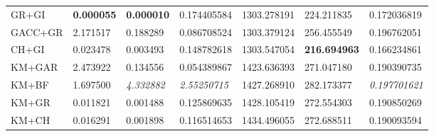\begin{table}[H]
\begin{tabular}{lllllll}
        GR+GI      & \textbf{0.000055}                                                   & \textbf{0.000010}                                                     & 0.174405584                                                                        & 1303.278191          & 224.211835            & 0.172036819                       \\
        GACC+GR    & 2.171517                                                            & 0.188289                                                              & 0.086708524                                                                        & 1303.379124          & 256.455549            & 0.196762051                       \\
        CH+GI      & 0.023478                                                            & 0.003493                                                              & 0.148782618                                                                        & 1303.547054          & \textbf{216.694963}   & 0.166234861                       \\
        KM+GAR     & 2.473922                                                            & 0.134556                                                              & 0.054389867                                                                        & 1423.636393          & 271.047180            & 0.190390735                       \\
        KM+BF      & 1.697500                                                            & \textit{4.332882}                                                     & \textit{2.55250715}                                                                & 1427.268910          & 282.173377            & \textit{0.197701621}              \\
        KM+GR      & 0.011821                                                            & 0.001488                                                              & 0.125869635                                                                        & 1428.105419          & 272.554303            & 0.190850269                       \\
        KM+CH      & 0.016291                                                            & 0.001898                                                              & 0.116514653                                                                        & 1434.496055          & 272.688511            & 0.190093594                       \\

\end{tabular}
\end{table}
